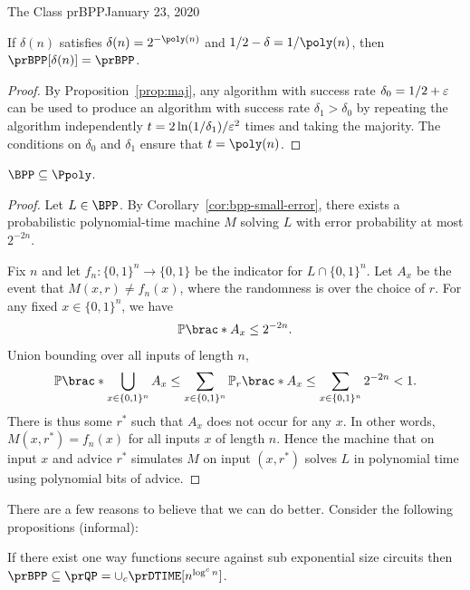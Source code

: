 \begin{lecture}{1}{The Class prBPP}{January 23, 2020}
\begin{corollary}\label{cor:bpp-small-error}
  If $\delta(n)$ satisfies $\delta(n) = 2^{-\poly(n)}$ and $1/2 - \delta =
  1/\poly(n)$, then $\prBPP[\delta(n)] = \prBPP$.
\end{corollary}

\begin{proof}
  By Proposition~\ref{prop:maj}, any algorithm with success rate $\delta_0 =
  1/2 + \varepsilon$ can be used to produce an algorithm with success rate $\delta_1 >
  \delta_0$ by repeating the algorithm independently $t =
  2\ln(1 / \delta_1)/\varepsilon^2$ times and taking the majority. The conditions on
  $\delta_0$ and $\delta_1$ ensure that $t = \poly(n)$.
\end{proof}

\begin{corollary}
  $\BPP \subseteq \Ppoly$.
\end{corollary}

\begin{proof}
    Let $L \in \BPP$. By Corollary~\ref{cor:bpp-small-error}, there exists a
    probabilistic polynomial-time machine $M$ solving $L$ with error
    probability at most $2^{-2n}$.

    Fix $n$ and let $f_n : \{0, 1\}^n \to \{0, 1\}$ be the indicator for $L
    \cap \{0, 1\}^n$. Let $A_x$ be the event that $M(x, r) \ne f_n(x)$, where
    the randomness is over the choice of $r$. For any fixed $x \in \{0, 1\}^n$,
    we have
    \begin{align*}
      \Pr\brac*{A_x} \leq 2^{-2n}.
    \end{align*}
    Union bounding over all inputs of length $n$, \[
      \Pr\brac*{\bigcup_{x \in \set{0, 1}^n} A_x}
      \leq \sum_{x \in \set{0,1}^n} \Pr_r\brac*{A_x}
      \leq \sum_{x \in \set{0,1}^n} 2^{-2n}
      < 1.
    \]
    There is thus some $r^*$ such that $A_x$ does not occur for any $x$. In
    other words, $M(x,r^*) = f_n(x)$ for all inputs $x$ of length $n$. Hence the
    machine that on input $x$ and advice $r^*$ simulates $M$ on input $(x,
    r^*)$ solves $L$ in polynomial time using polynomial bits of advice.
\end{proof}

There are a few reasons to believe that we can do better. Consider the following propositions (informal):

\begin{proposition}[BM82,GGM84]
	If there exist one way functions secure against sub exponential size circuits then $\prBPP \subseteq \prQP = \cup_c \prDTIME[n^{\log^c n}]$.
\end{proposition}


\end{lecture}

